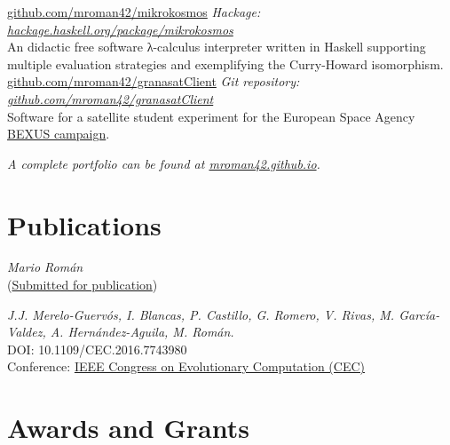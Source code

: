 \documentclass[nocolors]{friggeri-cv-a4}
\begin{document}
\begin{entrylist}
{\href{https://github.com/mroman42/mikrokosmos}{github.com/mroman42/mikrokosmos}}
{\emph{Hackage: \href{https://hackage.haskell.org/package/mikrokosmos}{hackage.haskell.org/package/mikrokosmos}} \\
  An didactic free software λ-calculus interpreter written in Haskell supporting multiple evaluation strategies and exemplifying the Curry-Howard isomorphism.
}
{\href{https://github.com/mroman42/granasatClient}{github.com/mroman42/granasatClient}}
{\emph{Git repository: \href{https://github.com/mroman42/granasatClient}{github.com/mroman42/granasatClient}} \\
  Software for a satellite student experiment for the
  European Space Agency \href{http://rexusbexus.net/}{BEXUS campaign}.
}
\end{entrylist}

\textit{A complete portfolio can be found at \href{https://mroman42.github.io}{mroman42.github.io}.}

 \section{Publications}

 \begin{entrylist}
   {
     \textit{Mario Román} \\
     (\href{https://github.com/openjournals/jose-papers/blob/jose.00029/jose.00029/10.21105.jose.00029.pdf}{Submitted for publication})
   }
   
   {
     \textit{J.J. Merelo-Guervós, I. Blancas, P. Castillo, G. Romero, V. Rivas, M. García-Valdez, A. Hernández-Aguila, M. Román.} \\
     DOI: 10.1109/CEC.2016.7743980 \\
     Conference: \href{http://ieeexplore.ieee.org/document/7743980/2016}{IEEE Congress on Evolutionary Computation (CEC)}
     }
 \end{entrylist}

\section{Awards and Grants}
\end{document}
